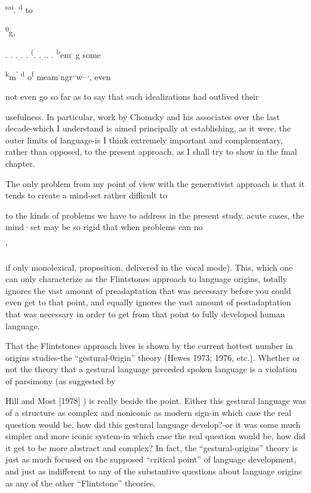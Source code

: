 \textsuperscript{sa}\textsuperscript{i}. \textsuperscript{d} to

\textsuperscript{0}g,

\textsuperscript{{\textquotedbl}}. . . . .\textsuperscript{{\textquotedbl}} \textsuperscript{(}\textsuperscript{{\textquotedbl}}. . .. .\textsuperscript{{\textquotedbl}} \textsuperscript{b}em\textsuperscript{.} g some

\textsuperscript{k}m\textsuperscript{'} \textsuperscript{d} o\textsuperscript{f} meam\textsuperscript{.}ngr\textsuperscript{,}\textsuperscript{.}w\textsuperscript{\_}\textsuperscript{,}, even

not even go so far as to say that such idealizations had outlived their

usefulness. In particular, work by Chomsky and his associates over the last decade-which I understand is aimed principally at establishing, as it were, the outer limits of language-is I think extremely important and complementary, rather than opposed, to the present approach, as I shall try to show in the fmal chapter.

The only problem from my point of view with the generativist approach is that it tends to create a mind-set rather difficult to

to the kinds of problems we have to address in the present study. acute cases, the mind·set may be so rigid that when problems can no

'

if only monolexical, proposition, delivered in the vocal mode). This, which one can only characterize as the Flintstones approach to lan\-guage origins, totally ignores the vast amount of preadaptation that was necessary before you could even get to that point, and equally ignores the vast amount of postadaptation that was necessary in order to get from that point to fully developed human language.

That the Flintstones approach lives is shown by the current hottest number in origins studies-the ``gestural-0rigin'' theory (Hewes 1973; 1976, etc.). Whether or not the theory that a gestural language preceded spoken language is a violation of parsimony (as suggested by


Hill and Most [1978] ) is really beside the point. Either this gestural language was of a structure as complex and noniconic as modern sign-in which case the real question would be, how did this gestural language develop?-or it was some much simpler and more iconic system-in which case the real question would be, how did it get to be more abstract and complex? In fact, the ``gestural-origins'' theory is just as much focused on the supposed ``critical point'' of language development, and just as indifferent to any of the substantive questions about language origins as any of the other ``Flintstone'' theories.

